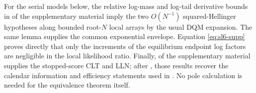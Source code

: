 For the serial models below, the relative log-mass and log-tail derivative
bounds in  of the supplementary material imply the two
\(O(N^{-1})\) squared-Hellinger hypotheses along bounded root-\(N\) local
arrays by the usual DQM expansion.  The same lemma supplies the common
exponential envelope.  Equation \eqref{eq:sl6-supp} proves directly that only the
increments of the equilibrium endpoint log factors are negligible in the
local likelihood ratio.  Finally,
 of the supplementary material supplies the stopped-score CLT
and LLN; after , those
results recover the calendar information and efficiency statements used in
.  No pole calculation is needed for the equivalence theorem
itself.
